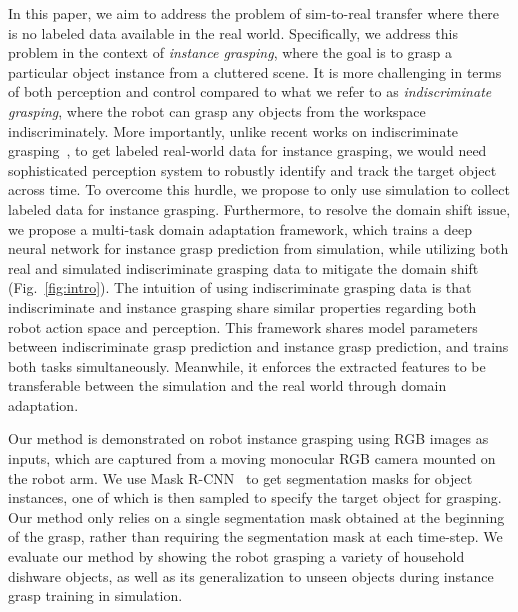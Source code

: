 \documentclass[letterpaper, 10 pt, conference]{ieeeconf}  %
\begin{document}
In this paper, we aim to address the problem of sim-to-real transfer where there is no labeled data available in the real world. Specifically, we address this problem in the context of \textit{instance grasping}, where the goal is to grasp a particular object instance from a cluttered scene. It is more challenging in terms of both perception and control compared to what we refer to as \textit{indiscriminate grasping}, where the robot can grasp any objects from the workspace indiscriminately. More importantly, unlike recent works on indiscriminate grasping~\cite{levine2016learning,gupta}, to get labeled real-world data for instance grasping, we would need sophisticated perception system to robustly identify and track the target object across time. To overcome this hurdle, we propose to only use simulation to collect labeled data for instance grasping. Furthermore, to resolve the domain shift issue, we propose a multi-task domain adaptation framework, which trains a deep neural network for instance grasp prediction from simulation, while utilizing both real and simulated indiscriminate grasping data to mitigate the domain shift (Fig.~\ref{fig:intro}). The intuition of using indiscriminate grasping data is that indiscriminate and instance grasping share similar properties regarding both robot action space and perception. This framework shares model parameters between indiscriminate grasp prediction and instance grasp prediction, and trains both tasks simultaneously. Meanwhile, it enforces the extracted features to be transferable between the simulation and the real world through domain adaptation.

Our method is demonstrated on robot instance grasping using RGB images as inputs, which are captured from a moving monocular RGB camera mounted on the robot arm. We use Mask R-CNN~\cite{he2017mask} to get segmentation masks for object instances, one of which is then sampled to specify the target object for grasping. Our method only relies on a single segmentation mask obtained at the beginning of the grasp, rather than requiring the segmentation mask at each time-step. We evaluate our method by showing the robot grasping a variety of household dishware objects, as well as its generalization to unseen objects during instance grasp training in simulation.
\end{document}

